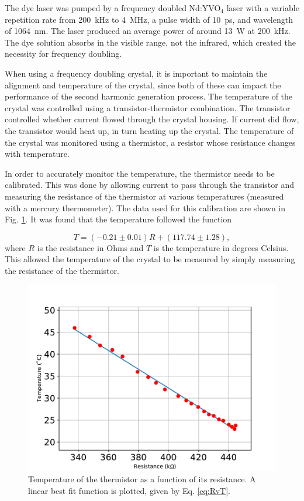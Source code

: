 The dye laser was pumped by a frequency doubled Nd:YVO$_4$ laser with a variable repetition rate from \SI{200}{ kHz} to \SI{4}{ MHz}, a pulse width of \SI{10}{\pico \second}, and wavelength of \SI{1064}{\nano \meter}. The laser produced an average power of around \SI{13}{W} at \SI{200}{\kilo Hz}. The dye solution  absorbs in the visible range, not the infrared, which created the necessity for frequency doubling.

When using a frequency doubling crystal, it is important to maintain the alignment and temperature of the crystal, since both of these can impact the performance of the second harmonic generation process. The temperature of the crystal was controlled using a transistor-thermistor combination. The transistor controlled whether current flowed through the crystal housing. If current did flow, the transistor would heat up, in turn heating up the crystal. The temperature of the crystal was monitored using a thermistor, a resistor whose resistance changes with temperature. 

In order to accurately monitor the temperature, the thermistor needs to be calibrated. This was done by allowing current to pass through the transistor and measuring the resistance of the thermistor at various temperatures (measured with a mercury thermometer). The data used for this calibration are shown in Fig. \ref{fig:rvt}. It was found that the temperature followed the function

\begin{equation}
	T = (-0.21 \pm 0.01)  R + (117.74 \pm 1.28),
	\label{eq:RvT}
\end{equation}
%
where $R$ is the resistance in Ohms and $T$ is the temperature in degrees Celsius. This allowed the temperature of the crystal to be measured by simply measuring the resistance of the thermistor.


\begin{figure}[h]
  \centering
  \includegraphics[width = .8\textwidth]{Images/bestfitRvT.pdf}
  \caption{Temperature of the thermistor as a function of its resistance. A linear best fit function is plotted, given by Eq. \ref{eq:RvT}.}
  \label{fig:rvt}
\end{figure}


